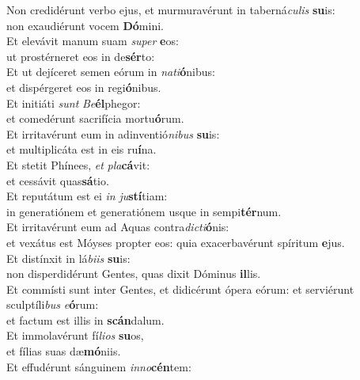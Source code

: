 \oddverse Non credidérunt verbo ejus, et murmuravérunt in taberná\textit{cu}\textit{lis} \textbf{su}is:~\*\\
\oddverse non exaudiérunt vocem \textbf{Dó}mini.\\
\evenverse Et elevávit manum suam \textit{su}\textit{per} \textbf{e}os:~\*\\
\evenverse ut prostérneret eos in de\textbf{sér}to:\\
\oddverse Et ut dejíceret semen eórum in \textit{na}\textit{ti}\textbf{ó}nibus:~\*\\
\oddverse et dispérgeret eos in regi\textbf{ó}nibus.\\
\evenverse Et initiáti \textit{sunt} \textit{Be}\textbf{él}phegor:~\*\\
\evenverse et comedérunt sacrifícia mortu\textbf{ó}rum.\\
\oddverse Et irritavérunt eum in adinventió\textit{ni}\textit{bus} \textbf{su}is:~\*\\
\oddverse et multiplicáta est in eis ru\textbf{í}na.\\
\evenverse Et stetit Phínees, \textit{et} \textit{pla}\textbf{cá}vit:~\*\\
\evenverse et cessávit quas\textbf{sá}tio.\\
\oddverse Et reputátum est ei \textit{in} \textit{ju}\textbf{stí}tiam:~\*\\
\oddverse in generatiónem et generatiónem usque in sempi\textbf{tér}num.\\
\evenverse Et irritavérunt eum ad Aquas contra\textit{di}\textit{cti}\textbf{ó}nis:~\*\\
\evenverse et vexátus est Móyses propter eos: quia exacerbavérunt spíritum \textbf{e}jus.\\
\oddverse Et distínxit in lá\textit{bi}\textit{is} \textbf{su}is:~\*\\
\oddverse non disperdidérunt Gentes, quas dixit Dóminus \textbf{il}lis.\\
\evenverse Et commísti sunt inter Gentes, et didicérunt ópera eórum: et serviérunt sculptíli\textit{bus} \textit{e}\textbf{ó}rum:~\*\\
\evenverse et factum est illis in \textbf{scán}dalum.\\
\oddverse Et immolavérunt fí\textit{li}\textit{os} \textbf{su}os,~\*\\
\oddverse et fílias suas dæ\textbf{mó}niis.\\
\evenverse Et effudérunt sánguinem \textit{in}\textit{no}\textbf{cén}tem:~\*\\
